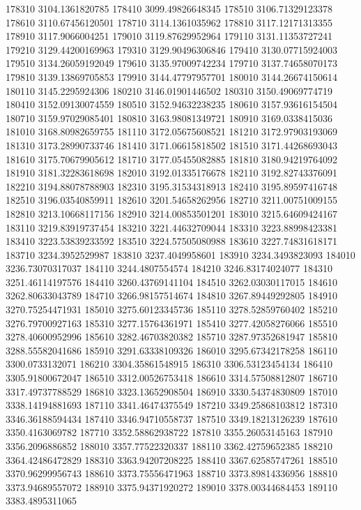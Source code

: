 {178310 3104.1361820785
178410 3099.49826648345
178510 3106.71329123378
178610 3110.67456120501
178710 3114.1361035962
178810 3117.12171313355
178910 3117.9066004251
179010 3119.87629952964
179110 3131.11353727241
179210 3129.44200169963
179310 3129.90496306846
179410 3130.07715924003
179510 3134.26059192049
179610 3135.97009742234
179710 3137.74658070173
179810 3139.13869705853
179910 3144.47797957701
180010 3144.26674150614
180110 3145.2295924306
180210 3146.01901446502
180310 3150.49069774719
180410 3152.09130074559
180510 3152.94632238235
180610 3157.93616154504
180710 3159.97029085401
180810 3163.98081349721
180910 3169.0338415036
181010 3168.80982659755
181110 3172.05675608521
181210 3172.97903193069
181310 3173.28990733746
181410 3171.06615818502
181510 3171.44268693043
181610 3175.70679905612
181710 3177.05455082885
181810 3180.94219764092
181910 3181.32283618698
182010 3192.01335176678
182110 3192.82743376091
182210 3194.88078788903
182310 3195.31534318913
182410 3195.89597416748
182510 3196.03540859911
182610 3201.54658262956
182710 3211.00751009155
182810 3213.10668117156
182910 3214.00853501201
183010 3215.64609424167
183110 3219.83919737454
183210 3221.44632709044
183310 3223.88998423381
183410 3223.53839233592
183510 3224.57505080988
183610 3227.74831618171
183710 3234.3952529987
183810 3237.4049958601
183910 3234.3493823093
184010 3236.73070317037
184110 3244.4807554574
184210 3246.83174024077
184310 3251.46114197576
184410 3260.43769141104
184510 3262.03030117015
184610 3262.80633043789
184710 3266.98157514674
184810 3267.89449292805
184910 3270.75254471931
185010 3275.60123345736
185110 3278.52859760402
185210 3276.79700927163
185310 3277.15764361971
185410 3277.42058276066
185510 3278.40600952996
185610 3282.46703820382
185710 3287.97352681947
185810 3288.55582041686
185910 3291.63338109326
186010 3295.67342178258
186110 3300.0733132071
186210 3304.35861548915
186310 3306.53123454134
186410 3305.91800672047
186510 3312.00526753418
186610 3314.57508812807
186710 3317.49737788529
186810 3323.13652908504
186910 3330.54374830809
187010 3338.14194881693
187110 3341.46474375549
187210 3349.25868103812
187310 3346.36188594434
187410 3346.94710558737
187510 3349.18213126239
187610 3350.4163069782
187710 3352.58862938722
187810 3355.26053145163
187910 3356.2096886852
188010 3357.77522320337
188110 3362.42759652385
188210 3364.42486472829
188310 3363.94207208225
188410 3367.62585747261
188510 3370.96299956743
188610 3373.75556471963
188710 3373.89814336956
188810 3373.94689557072
188910 3375.94371920272
189010 3378.00344684453
189110 3383.4895311065
}
